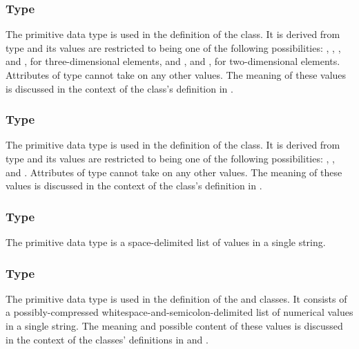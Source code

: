 \subsubsection{Type \fixttspace{}}
\label{primtype-PrimitiveKind}

The  primitive data type is used in the definition of the \CSGPrimitive class.  It is derived from type  and its values are restricted to being one of the following possibilities: , , , and , for three-dimensional \CSGObject elements, and , and , for two-dimensional \CSGObject elements.  Attributes of type  cannot take on any other values.  The meaning of these values is discussed in the context of the \CSGPrimitive class's definition in .


\subsubsection{Type \fixttspace{}}
\label{primtype-SetOperation}

The  primitive data type is used in the definition of the \CSGSetOperator class.  It is derived from type  and its values are restricted to being one of the following possibilities: , , and .  Attributes of type  cannot take on any other values.  The meaning of these values is discussed in the context of the \CSGSetOperator class's definition in .


\subsubsection{Type \fixttspace{}}
\label{primtype-doubleArray}

The  primitive data type is a space-delimited list of  values in a single string.  

\subsubsection{Type \fixttspace{}}
\label{primtype-arrayData}

The  primitive data type is used in the definition of the \SampledField and \ParametricObject classes.  It consists of a possibly-compressed whitespace-and-semicolon-delimited list of numerical values in a single string.  The meaning and possible content of these values is discussed in the context of the classes' definitions in  and .


